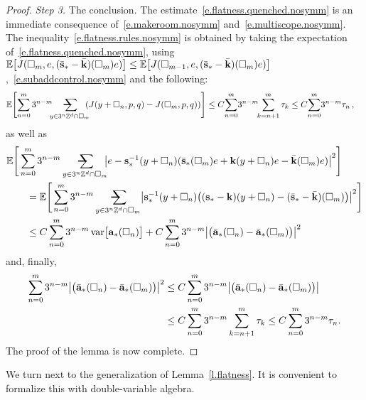 \documentclass[11pt,twoside]{article} %
\makeatletter
\let\oldsquare\square %
\renewcommand{\square}{\oldsquare}
\numberwithin{equation}{section}
\theoremstyle{definition}
\let\originalleft\left
\let\originalright\right
\renewcommand{\left}{\mathopen{}\mathclose\bgroup\originalleft}
\renewcommand{\right}{\aftergroup\egroup\originalright}
\newcommand*{\Zd}{\ensuremath{\mathbb{Z}^d}}
\newcommand{\s}{\mathbf{s}}
\renewcommand{\a}{\mathbf{a}}
\renewcommand{\k}{\mathbf{k}}
\newcommand{\ahom}{\bar{\a}}
\newcommand{\shom}{\bar{\mathbf{s}}}
\newcommand{\khom}{\bar{\mathbf{k}}}
\newcommand{\cu}{\square}
\newcommand{\E}{\mathbb{E}}
\DeclareMathOperator{\var}{var}
\newcommand{\avsum}{\mathop{\mathpalette\avsuminner\relax}\displaylimits}
\newcommand\avsuminner[2]{%
  {\sbox0{$\m@th#1\sum$}%
   \vphantom{\usebox0}%
   \ooalign{%
     \hidewidth
     \smash{\,\rule[.23em]{8.8pt}{1.1pt} \relax}%
     \hidewidth\cr
   ~$\m@th#1\sum$\cr
   }%
  }%
}
\makeatother
\begin{document}
\begin{proof}
\smallskip

\emph{Step 3.} The conclusion. The estimate~\eqref{e.flatness.quenched.nosymm}
is an immediate consequence of~\eqref{e.makeroom.nosymm} and~\eqref{e.multiscope.nosymm}.
The inequality~\eqref{e.flatness.rules.nosymm} is obtained by taking the expectation of~\eqref{e.flatness.quenched.nosymm}, using 
$\E \left[ J(\cu_m,e,(\shom_*-\khom)(\cu_m)e) \right] \leq \E \left[ J(\cu_{m-1},e,(\shom_*-\khom)(\cu_m)e) \right]$,~\eqref{e.subaddcontrol.nosymm} and the following:
\begin{align*}
\E\Biggl [
\sum_{n=0}^{{m}} 3^{n-m} \!\!\!
\avsum_{y\in 3^{n}\Zd\cap \cu_m} \!\!\!
( J(y+\cu_{n},p,q) - J (\cu_m,p,q) ) \Biggr ]
&
\leq
C\!\sum_{n=0}^{{m}} \! 3^{n-m} \!\!
\sum_{k=n+1}^{{m}} \tau_k 
\leq
C\! \sum_{n=0}^{{m}} \! 3^{n-m} \tau_n\,,
\end{align*}
as well as 
\begin{align*}
\lefteqn{
\E \Bigg[
\sum_{n=0}^{{m}} 3^{n-m} 
\avsum_{y\in 3^n\Zd\cap \cu_{m}} \!\!
\left| e -\s_*^{-1}(y+\cu_n) ( \shom_*(\cu_m) e +\k(y+\cu_n)e - \khom(\cu_m)e )  \right|^2
\Bigg]
} \qquad & 
\notag \\ & 
=
\E \Bigg[
\sum_{n=0}^{{m}} 3^{n-m} 
\avsum_{y\in 3^n\Zd\cap \cu_{m}} 
\left| 
\s_*^{-1}(y+\cu_n) 
\bigl(
(\s_*-\k)(y+\cu_n) - (\shom_*-\khom)(\cu_m)
\bigr)
\right|^2
\Bigg]
\notag \\ & 
\leq 
C
\sum_{n=0}^{{m}} 3^{n-m} 
\var \bigl[  \a_*(\cu_n) \bigr]
+
C
\sum_{n=0}^{{m}} 3^{n-m} 
\left| \bigl(
\ahom_*(\cu_n) - \ahom_* (\cu_m) \bigr) 
\right|^2
\end{align*}
and, finally, 
\begin{align*}
\sum_{n=0}^{{m}} 3^{n-m} 
\left| \bigl(
\ahom_*(\cu_n) - \ahom_* (\cu_m) \bigr) 
\right|^2
&\leq 
C\sum_{n=0}^{{m}} 3^{n-m} 
\left| \bigl(
\ahom_*(\cu_n) - \ahom_* (\cu_m) \bigr) 
\right|
\notag \\ & 
\leq 
C\sum_{n=0}^{{m}} 
3^{n-m} \sum_{k=n+1}^m \tau_k
\leq 
C\sum_{n=0}^{{m}} 
3^{n-m} \tau_n.
\end{align*}
The proof of the lemma is now complete.
\end{proof}

We turn next to the generalization of Lemma~\ref{l.flatness}. It is convenient to formalize this with double-variable algebra. 
\end{document}
